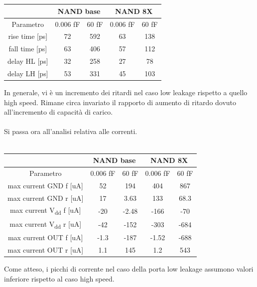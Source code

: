 \documentclass[11pt,  english, makeidx, a4paper, titlepage, oneside]{book}
\begin{document}
\\\\
\begin{center}
	\begin{tabular}{|c|c|c||c|c|}
	\hline
	& \multicolumn{2}{c}{NAND base} & \multicolumn{2}{c}{NAND 8X}\\
	\hline
	Parametro & 0.006 fF & 60 fF & 0.006 fF & 60 fF \\
	\hline
	rise time [ps] & 72 & 592 & 63 & 138\\
	\hline
	 fall time [ps] & 63 & 406 & 57 & 112 \\
	\hline
	delay HL [ps] & 32 & 258 & 27 & 78  \\
	\hline
	delay LH [ps] & 53 & 331 & 45 & 103 \\
	\hline
	\end{tabular}	
\end{center}
\vspace{0.3cm}
In generale, vi è un incremento dei ritardi nel caso low leakage rispetto a quello high speed. Rimane circa invariato il rapporto di aumento di ritardo dovuto all'incremento di capacità di carico.
\\\\
Si passa ora all'analisi relativa alle correnti.
\\\\
\begin{center}
	\begin{tabular}{|c|c|c||c|c|}
	\hline
	& \multicolumn{2}{c}{NAND base} & \multicolumn{2}{c}{NAND 8X}\\
	\hline
	Parametro & 0.006 fF & 60 fF & 0.006 fF & 60 fF \\
	\hline
	max current GND f [uA] & 52 & 194 & 404 & 867 \\
	\hline
	max current GND r [uA] & 17 & 3.63 & 133 & 68.3 \\
	\hline
	max current V\textsubscript{dd} f [uA] & -20 & -2.48 & -166 & -70 \\
	\hline
	max current V\textsubscript{dd} r [uA] & -42 & -152 & -303 & -684  \\
	\hline
	max current OUT f [uA] & -1.3 & -187 & -1.52 & -688 \\
	\hline
	max current OUT r [uA] & 1.1 & 145 & 1.2 & 543 \\
	\hline
	\end{tabular}	
\end{center}
\vspace{0.3cm}
Come atteso, i picchi di corrente nel caso della porta low leakage assumono valori inferiore rispetto al caso high speed.
\end{document}
